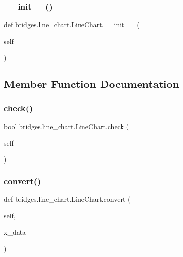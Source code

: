 \subsubsection{\texorpdfstring{\_\_init\_\_()}{\_\_init\_\_()}}
{\footnotesize\ttfamily def bridges.\+line\+\_\+chart.\+Line\+Chart.\+\_\+\+\_\+init\+\_\+\+\_\+ (\begin{DoxyParamCaption}\item[{}]{self }\end{DoxyParamCaption})}



\subsection{Member Function Documentation}
\mbox{\label{classbridges_1_1line__chart_1_1_line_chart_ac54bac5a0b78e88d1515dc4ec42dd61f}} 
\subsubsection{\texorpdfstring{check()}{check()}}
{\footnotesize\ttfamily  bool bridges.\+line\+\_\+chart.\+Line\+Chart.\+check (\begin{DoxyParamCaption}\item[{}]{self }\end{DoxyParamCaption})}

\mbox{\label{classbridges_1_1line__chart_1_1_line_chart_ab9d76afae32e71d0a640ac26b13e645c}} 
\subsubsection{\texorpdfstring{convert()}{convert()}}
{\footnotesize\ttfamily def bridges.\+line\+\_\+chart.\+Line\+Chart.\+convert (\begin{DoxyParamCaption}\item[{}]{self,  }\item[{}]{x\+\_\+data }\end{DoxyParamCaption})}

